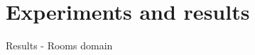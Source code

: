 \documentclass{beamer}
\theoremstyle{mystyle}
\begin{document}
\section{Experiments and results}
%
%
%
%
%    

\begin{frame}{Results - Rooms domain}


\end{frame}
\end{document}
